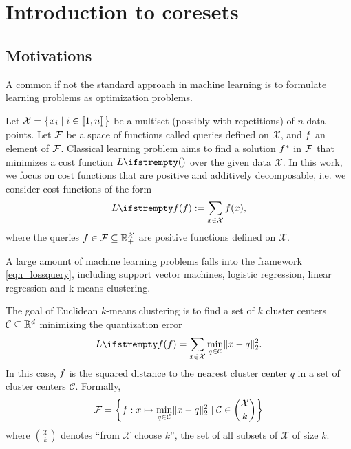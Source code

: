 
\chapter{Introduction to coresets}
\label{chap_intro_coresets}
\section{Motivations}


A common if not the standard approach in machine learning
is to formulate learning problems as optimization problems.

Let $\mathcal{X}=\begin{Bmatrix}
x_{i} \mid i\in \llbracket 1,n \rrbracket
\end{Bmatrix}$ be a multiset (possibly with repetitions) of $n$ data points. Let $\mathcal{F}$ be a space of functions called queries defined on $\mathcal{X}$, and $f$ an element of $\mathcal{F}$. Classical learning problem aims to find a solution $f ^*$ in $\mathcal{F}$ that minimizes a cost function $\loss{}$ over the given data $\mathcal{X}$. In this work, we focus on cost functions that are positive and additively decomposable, i.e. we consider cost functions of the form
\begin{equation}
    \label{eqn_lossquery}
\loss{\query}:=\sum_{x \in \mathcal{X}} \query (x),
\end{equation}
where the queries $f \in \mathcal{F} \subseteq \mathbb{R}_+^{\mathcal{X}}$ are positive functions defined on $\mathcal{X}$.

A large amount of machine learning problems falls into the framework \cref{eqn_lossquery}, including support vector machines, logistic regression, linear regression and k-means clustering. 
\begin{example}[$k$-means]  
    The goal of Euclidean $k$-means clustering is to find a set of $k$ cluster centers $\mathcal{C}\subseteq \mathbb{R}^d$ minimizing the quantization error
    \begin{equation*}
    \loss{\query} = \sum_{x \in \mathcal{X}} \min_{q \in \mathcal{C} } \lVert x - q \rVert^2_2.
    \end{equation*}
    In this case, $f$ is the squared distance to the nearest cluster center $q$ in a set of cluster centers $\mathcal{C}$. Formally, 
    \begin{equation*}
        \mathcal{F} = \left\{f : x \mapsto \min_{q \in \mathcal{C} } \lVert x - q \rVert^2_2 \mid \mathcal{C}  \in \binom{\mathcal{X}}{k}\right\}
    \end{equation*}
    where $\binom{\mathcal{X}}{k}$ denotes ``from $\mathcal{X}$ choose $k$'', the set of all subsets of $\mathcal{X}$ of size $k$.
\end{example}

